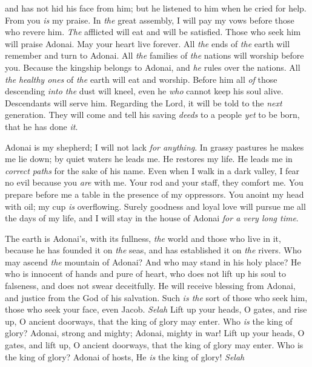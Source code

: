 \begin{biblechapter}
and has not hid his face from him; 
but he listened to him when he cried for help.
\verse From you \textit{is} my praise. 
In \textit{the} great assembly, 
I will pay my vows before those who revere him.
\verse \textit{The} afflicted will eat and will be satisfied. 
Those who seek him will praise Adonai. 
May your heart live forever.
\verse All \textit{the} ends of \textit{the} earth 
will remember and turn to Adonai. 
All \textit{the} families of \textit{the} nations 
will worship before you.
\verse Because the kingship belongs to Adonai, 
and \textit{he} rules over the nations.
\verse All \textit{the} \textit{healthy ones} of \textit{the} earth will eat and worship. 
Before him all \textit{of} those descending \textit{into the} dust will kneel, 
even he \textit{who} cannot keep his soul alive.
\verse Descendants will serve him. 
Regarding the Lord, it will be told to the \textit{next} generation.
\verse They will come and tell his saving \textit{deeds} 
to a people \textit{yet} to be born, that he has done \textit{it}.
\end{biblechapter}

\begin{biblechapter} %
 Adonai is my shepherd; 
I will not lack \textit{for anything}.
\verse In grassy pastures he makes me lie down; 
by quiet waters he leads me.
\verse He restores my life. 
He leads me in \textit{correct paths} 
for the sake of his name.
\verse Even when I walk in a dark valley, I fear no evil 
because you \textit{are} with me. 
Your rod and your staff, they comfort me.
\verse You prepare before me a table 
in the presence of my oppressors. 
You anoint my head with oil; 
my cup \textit{is} overflowing.
\verse Surely goodness and loyal love will pursue me 
all the days of my life, 
and I will stay in the house of Adonai 
\textit{for a very long time}.
\end{biblechapter}

\begin{biblechapter} %
 The earth is Adonai’s, with its fullness, 
\textit{the} world and those who live in it,
\verse because he has founded it on \textit{the} seas, 
and has established it on \textit{the} rivers.
\verse Who may ascend \textit{the} mountain of Adonai? 
And who may stand in his holy place?
\verse He who is innocent of hands and pure of heart, 
who does not lift up his soul to falseness, 
and does not swear deceitfully.
\verse He will receive blessing from Adonai, 
and justice from the God of his salvation.
\verse Such \textit{is the} sort of those who seek him, 
those who seek your face, even Jacob. \textit{Selah}
\verse Lift up your heads, O gates, 
and rise up, O ancient doorways, 
that the king of glory may enter.
\verse Who \textit{is} the king of glory? 
Adonai, strong and mighty; 
Adonai, mighty in war!
\verse Lift up your heads, O gates, 
and lift up, O ancient doorways, 
that the king of glory may enter.
\verse Who is the king of glory? 
Adonai of hosts, 
He \textit{is} the king of glory! \textit{Selah}
\end{biblechapter}

